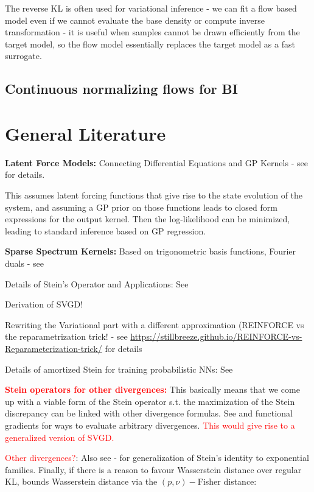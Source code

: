 \documentclass[12pt]{article}
\renewcommand{\[}{\left[}
\renewcommand{\]}{\right]}
\renewcommand{\(}{\left(}
\renewcommand{\)}{\right)}
\begin{document}
The reverse KL is often used for variational inference - we can fit a flow based model even if we cannot evaluate the base density or compute inverse transformation - it is useful when samples cannot be drawn efficiently from the target model, so the flow model essentially replaces the target model as a fast surrogate.

\subsection{Continuous normalizing flows for BI}


\section{General Literature}

\noindent \textbf{Latent Force Models:} Connecting Differential Equations and GP Kernels - see \cite{alvarez09a} for details.

\noindent This assumes latent forcing functions that give rise to the state evolution of the system, and assuming a GP prior on those functions leads to closed form expressions for the output kernel. Then the log-likelihood can be minimized, leading to standard inference based on GP regression.

\noindent \textbf{Sparse Spectrum Kernels:} Based on trigonometric basis functions, Fourier duals - see \cite{lazaro-gredilla_sparse_2010}

Details of Stein's Operator and Applications: See \cite{anastasiou_steins_2023}

\noindent Derivation of SVGD!


\noindent Rewriting the Variational part with a different approximation (\textsc{REINFORCE} vs the reparametrization trick! - see \url{https://stillbreeze.github.io/REINFORCE-vs-Reparameterization-trick/} for details


\noindent Details of amortized Stein for training probabilistic NNs: See \cite{feng_learning_2017}


\noindent \textcolor{red}{\textbf{Stein operators for other divergences:}} This basically means that we come up with a viable form of the Stein operator s.t. the maximization of the Stein discrepancy can be linked with other divergence formulas. See \cite{zozor_debruijn_2015} and functional gradients for ways to evaluate arbitrary divergences. \textcolor{red}{This would give rise to a generalized version of SVGD.} 


\noindent \textcolor{red}{Other divergences?}: Also see - \cite{kattumannil_steins_2009} for generalization of Stein's identity to exponential families. Finally, if there is a reason to favour Wasserstein distance over regular KL, \cite{huggins_practical_2018} bounds Wasserstein distance via the $(p, \nu)-$Fisher distance:
\end{document}

